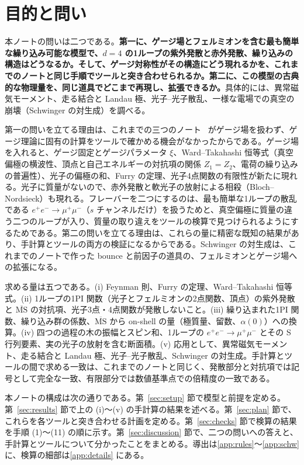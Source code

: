 \documentclass[a4paper,10pt]{ltjsarticle}
\newcommand{\MSbar}{\overline{\mathrm{MS}}}
\begin{document}
\tableofcontents

\section{目的と問い}\label{sec:intro}

本ノートの問いは二つである。\textbf{第一に、ゲージ場とフェルミオンを含む最も簡単な繰り込み可能な模型で、$d=4$ の1ループの紫外発散と赤外発散、繰り込みの構造はどうなるか。そして、ゲージ対称性がその構造にどう現れるかを、これまでのノートと同じ手順でツールと突き合わせられるか。第二に、この模型の古典的な物理量を、同じ道具でどこまで再現し、拡張できるか。}具体的には、異常磁気モーメント、走る結合と Landau 極、光子--光子散乱、一様な電場での真空の崩壊（Schwinger の対生成）を調べる。

第一の問いを立てる理由は、これまでの三つのノート~\cite{phi3note,phi34note,yukawanote} がゲージ場を扱わず、ゲージ理論に固有の計算をツールで確かめる機会がなかったからである。ゲージ場を入れると、ゲージ固定とゲージパラメータ $\xi$、Ward--Takahashi 恒等式（真空偏極の横波性、頂点と自己エネルギーの対抗項の関係 $Z_1=Z_2$、電荷の繰り込みの普遍性）、光子の偏極の和、Furry の定理、光子4点関数の有限性が新たに現れる。光子に質量がないので、赤外発散と軟光子の放射による相殺（Bloch--Nordsieck）も現れる。フレーバーを二つにするのは、最も簡単な1ループの散乱である $e^+e^-\to\mu^+\mu^-$（$s$ チャンネルだけ）を扱うためと、真空偏極に質量の違う二つのループが入り、質量の取り違えをツールの検算で見つけられるようにするためである。第二の問いを立てる理由は、これらの量に精密な既知の結果があり、手計算とツールの両方の検証になるからである。Schwinger の対生成は、これまでのノートで作った bounce と前因子の道具の、フェルミオンとゲージ場への拡張になる。

求める量は五つである。(i) Feynman 則、Furry の定理、Ward--Takahashi 恒等式。(ii) 1ループの1PI 関数（光子とフェルミオンの2点関数、頂点）の紫外発散と $\MSbar$ の対抗項、光子3点・4点関数が発散しないこと。(iii) 繰り込まれた1PI 関数、繰り込み群の係数、$\MSbar$ から on-shell の量（極質量、留数、$\alpha(0)$）への換算。(iv) 四つの過程の木の振幅とスピン和、1ループの $e^+e^-\to\mu^+\mu^-$ とその S 行列要素、実の光子の放射を含む断面積。(v) 応用として、異常磁気モーメント、走る結合と Landau 極、光子--光子散乱、Schwinger の対生成。手計算とツールの間で求める一致は、これまでのノートと同じく、発散部分と対抗項では記号として完全な一致、有限部分では数値基準点での倍精度の一致である。

本ノートの構成は次の通りである。第~\ref{sec:setup} 節で模型と前提を定める。第~\ref{sec:results} 節で上の (i)〜(v) の手計算の結果を述べる。第~\ref{sec:plan} 節で、これらを各ツールと突き合わせる計画を定める。第~\ref{sec:checks} 節で検算の結果を手順 (1)〜(11) の順に示す。第~\ref{sec:discussion} 節で、二つの問いへの答えと、手計算とツールについて分かったことをまとめる。導出は\ref{app:rules}〜\ref{app:schw} に、検算の細部は\ref{app:details} にある。
\end{document}
